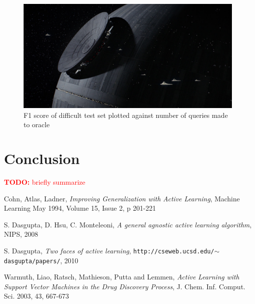 \documentclass[paper=a4, fontsize=11pt]{scrartcl}
\numberwithin{equation}{section}    %
\numberwithin{figure}{section}      %
\numberwithin{table}{section}       %
\newcommand{\TODO}[1]{\textcolor{red}{\textbf{TODO: } #1}}
\numberwithin{equation}{section}    %
\numberwithin{figure}{section}      %
\numberwithin{table}{section}       %
\begin{document}
\begin{figure}[!htb]
  \centering
  \includegraphics[scale = 0.35]{figures/fig.jpg}
      \caption{F1 score of difficult test set plotted against number of queries made to oracle}
      \label{hardf}
\end{figure}


\FloatBarrier

\section{Conclusion}

\TODO{briefly summarize}


\begin{thebibliography}{1}

Cohn, Atlas, Ladner, \emph{Improving  Generalization  with  Active  Learning},  Machine Learning May 1994, Volume 15, Issue 2, p 201-221

S. Dasgupta, D. Hsu, C. Monteleoni, \emph{A general agnostic active learning algorithm}, NIPS, 2008 

S. Dasgupta, \emph{Two faces of active learning},  \texttt{http://cseweb.ucsd.edu/$\sim$dasgupta/papers/}, 2010

Warmuth, Liao, Ratsch, Mathieson, Putta and Lemmen, \emph{Active Learning with Support Vector Machines in the Drug Discovery Process}, J. Chem. Inf. Comput. Sci. 2003, 43, 667-673

\end{thebibliography}
\end{document}
